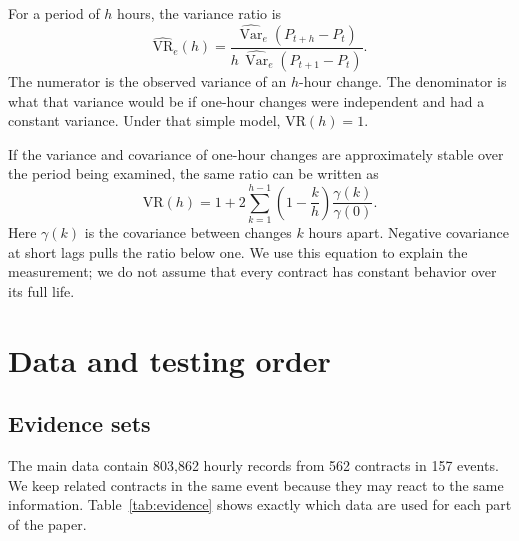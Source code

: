 \documentclass[10pt,twoside]{article}
\begin{document}
For a period of $h$ hours, the variance ratio is
\begin{equation}
  \widehat{\mathrm{VR}}_e(h)
  =\frac{\widehat{\operatorname{Var}}_e(P_{t+h}-P_t)}
  {h\,\widehat{\operatorname{Var}}_e(P_{t+1}-P_t)}.
  \label{eq:variance-ratio}
\end{equation}
The numerator is the observed variance of an $h$-hour change. The denominator is what that variance would be if one-hour changes were independent and had a constant variance. Under that simple model, $\mathrm{VR}(h)=1$.

If the variance and covariance of one-hour changes are approximately stable over the period being examined, the same ratio can be written as
\begin{equation}
  \mathrm{VR}(h)
  =1+2\sum_{k=1}^{h-1}\left(1-\frac{k}{h}\right)\frac{\gamma(k)}{\gamma(0)}.
  \label{eq:vr-covariance}
\end{equation}
Here $\gamma(k)$ is the covariance between changes $k$ hours apart. Negative covariance at short lags pulls the ratio below one. We use this equation to explain the measurement; we do not assume that every contract has constant behavior over its full life.

\section{Data and testing order}

\subsection{Evidence sets}

The main data contain 803,862 hourly records from 562 contracts in 157 events. We keep related contracts in the same event because they may react to the same information. Table~\ref{tab:evidence} shows exactly which data are used for each part of the paper.
\end{document}
